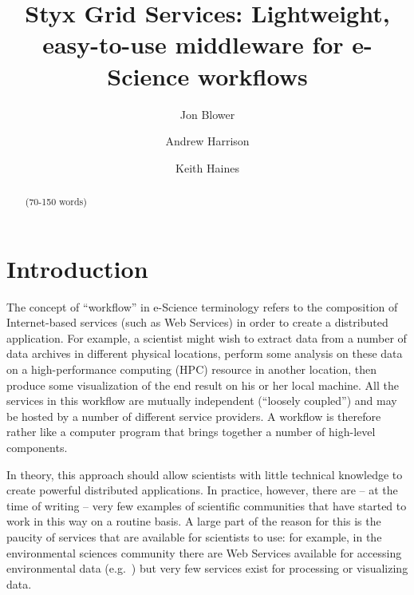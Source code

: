 \documentclass{llncs}
\begin{document}
%
\title{Styx Grid Services: Lightweight, easy-to-use middleware for e-Science workflows}
%
%
\author{Jon Blower \and Andrew Harrison
\and Keith Haines}
%
%
%

\maketitle              %

\begin{abstract}
(70-150 words)
\end{abstract}
%
\section{Introduction}
The concept of ``workflow'' in e-Science terminology refers to the composition of Internet-based services (such as Web Services) in order to create a distributed application.  For example, a scientist might wish to extract data from a number of data archives in different physical locations, perform some analysis on these data on a high-performance computing (HPC) resource in another location, then produce some visualization of the end result on his or her local machine.  All the services in this workflow are mutually independent (``loosely coupled'') and may be hosted by a number of different service providers.  A workflow is therefore rather like a computer program that brings together a number of high-level components.

In theory, this approach should allow scientists with little technical knowledge to create powerful distributed applications.  In practice, however, there are -- at the time of writing -- very few examples of scientific communities that have started to work in this way on a routine basis.  A large part of the reason for this is the paucity of services that are available for scientists to use: for example, in the environmental sciences community there are Web Services available for accessing environmental data (e.g.\ \cite{Woolf:2003}) but very few services exist for processing or visualizing data.
\end{document}
